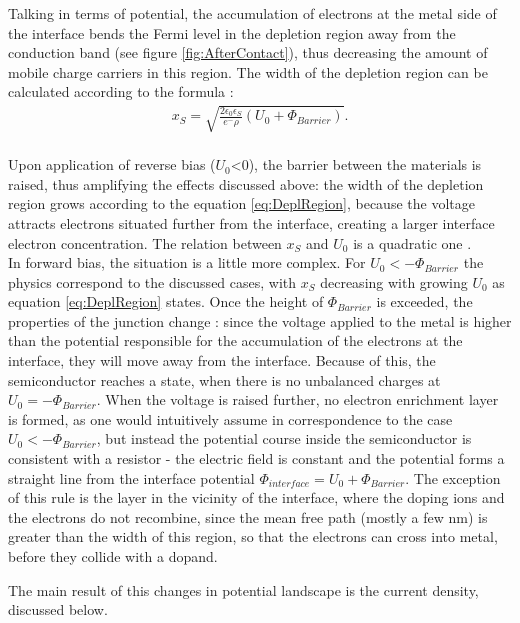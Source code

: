 \documentclass[12pt]{article}
\begin{document}
Talking in terms of potential, the accumulation of electrons at the metal side of the interface bends the Fermi level in the depletion region away from the conduction band (see figure \ref{fig:AfterContact}), thus decreasing the amount of mobile charge carriers in this region.
The width of the depletion region can be calculated according to the formula :
\begin{align}
 \label{eq:DeplRegion}
 x_S = \sqrt{\frac{2 \epsilon _0 \epsilon _S}{e^- \rho}(U_0 + \Phi_{Barrier})}.
\end{align}
\\
Upon application of reverse bias ($U_0$<0), the barrier between the materials is raised, thus amplifying the effects discussed above: the width of the depletion region grows according to the equation \ref{eq:DeplRegion}, because the voltage attracts electrons situated further from the interface, creating a larger interface electron concentration. The relation between $x_S$ and $U_0$ is a quadratic one \cite{Fundamentals}.
\\
In forward bias, the situation is a little more complex. For $U_0 < -\Phi_{Barrier}$ the physics correspond to the discussed cases, with $x_S$ decreasing with growing $U_0$ as equation \ref{eq:DeplRegion} states. Once the height of $\Phi_{Barrier}$ is exceeded, the properties of the junction change : since the voltage applied to the metal is higher than the potential responsible for the accumulation of the electrons at the interface, they will move away from the interface. Because of this, the semiconductor reaches a state, when there is no unbalanced charges at $U_0 = -\Phi_{Barrier}$. When the voltage is raised further, no electron enrichment layer is formed, as one would intuitively assume in correspondence to the case $U_0 < -\Phi_{Barrier}$, but instead the potential course inside the semiconductor is consistent with a resistor - the electric field is constant and the potential forms a straight line from the interface potential $\Phi_{interface} = U_0 + \Phi_{Barrier}$. The exception of this rule is the layer in the vicinity of the interface, where the doping ions and the electrons do not recombine, since the mean free path (mostly a few nm) is greater than the width of this region, so that the electrons can cross into metal, before they collide with a dopand. 

The main result of this changes in potential landscape is the current density, discussed below.
\end{document}
